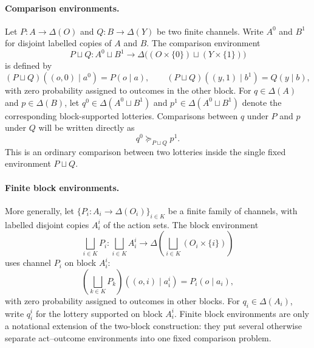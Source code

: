 \documentclass[11pt,a4paper]{article}
\theoremstyle{definition}
\newcommand{\1}{\mathbf 1}
\begin{document}
\paragraph{Comparison environments.}
Let $P:A\to\Delta(O)$ and $Q:B\to\Delta(Y)$ be two finite channels.  Write $A^0$ and $B^1$ for disjoint labelled
copies of $A$ and $B$.  The comparison environment
\[
P\sqcup Q:
A^0\sqcup B^1\to\Delta\bigl((O\times\{0\})\sqcup(Y\times\{1\})\bigr)
\]
is defined by
\[
(P\sqcup Q)((o,0)\mid a^0)=P(o\mid a),
\qquad
(P\sqcup Q)((y,1)\mid b^1)=Q(y\mid b),
\]
with zero probability assigned to outcomes in the other block.  For $q\in\Delta(A)$ and $p\in\Delta(B)$, let
$q^0\in\Delta(A^0\sqcup B^1)$ and $p^1\in\Delta(A^0\sqcup B^1)$ denote the corresponding block-supported lotteries.
Comparisons between $q$ under $P$ and $p$ under $Q$ will be written directly as
\[
q^0\succeq_{P\sqcup Q}p^1.
\]
This is an ordinary comparison between two lotteries inside the single fixed environment $P\sqcup Q$.

\paragraph{Finite block environments.}
More generally, let $\{P_i:A_i\to\Delta(O_i)\}_{i\in K}$ be a finite family of channels, with labelled disjoint copies
$A_i^i$ of the action sets.  The block environment
\[
\bigsqcup_{i\in K}P_i:
\bigsqcup_{i\in K}A_i^i
\to
\Delta\left(\bigsqcup_{i\in K}(O_i\times\{i\})\right)
\]
uses channel $P_i$ on block $A_i^i$:
\[
\left(\bigsqcup_{k\in K}P_k\right)((o,i)\mid a_i^i)=P_i(o\mid a_i),
\]
with zero probability assigned to outcomes in other blocks.  For $q_i\in\Delta(A_i)$, write $q_i^i$ for the lottery
supported on block $A_i^i$.
Finite block environments are only a notational extension of the two-block construction: they put several otherwise
separate act--outcome environments into one fixed comparison problem.
\end{document}
